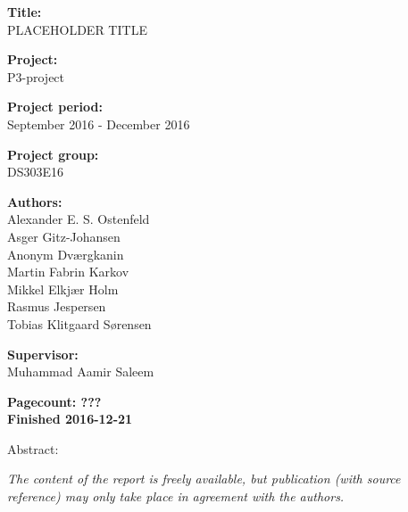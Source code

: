 \begin{minipage}[t]{0.48\textwidth}
\textbf{Title:} \\[5pt]\bigskip\hspace{2ex}
PLACEHOLDER TITLE

\textbf{Project:} \\[5pt]\bigskip\hspace{2ex}
P3-project

\textbf{Project period:} \\[5pt]\bigskip\hspace{2ex}
September 2016 - December 2016

\textbf{Project group:} \\[5pt]\bigskip\hspace{2ex}
DS303E16

\textbf{Authors:} \\[5pt]\hspace*{2ex}
Alexander E. S. Ostenfeld \\\hspace*{2ex}
Asger Gitz-Johansen \\\hspace*{2ex}
Anonym Dværgkanin \\\hspace*{2ex} 
Martin Fabrin Karkov \\\hspace*{2ex}
Mikkel Elkjær Holm \\\hspace*{2ex}
Rasmus Jespersen \\\bigskip\hspace*{2ex}
Tobias Klitgaard Sørensen

\textbf{Supervisor:} \\[5pt]\hspace*{2ex}
Muhammad Aamir Saleem

\vspace*{1cm}

\textbf{Pagecount: ???} \\
\textbf{Finished 2016-12-21}

\end{minipage}
\hfill
\begin{minipage}[t]{0.483\textwidth}
Abstract: \\[5pt]
\fbox{\parbox{7cm}{\bigskip\bigskip}}
\end{minipage}

\vfill

{\footnotesize\itshape The content of the report is freely available, but publication (with source reference) may only take place in agreement with the authors.}

